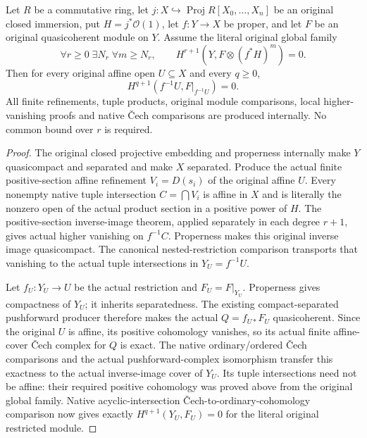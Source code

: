 \begin{theorem}
\label{thm:proj-affine-original-inverse-higher-vanishing}
\leanok
Let $R$ be a commutative ring, let
$j:X\hookrightarrow\operatorname{Proj}R[X_0,\ldots,X_n]$ be an
original closed immersion, put $H=j^*\mathcal O(1)$, let
$f:Y\to X$ be proper, and let $F$ be an original quasicoherent module
on $Y$. Assume the literal original global family
\[
 \forall r\geq0\;\exists N_r\;\forall m\geq N_r,\qquad
 H^{r+1}(Y,F\otimes(f^*H)^m)=0.
\]
Then for every original affine open $U\subseteq X$ and every $q\geq0$,
\[
 H^{q+1}(f^{-1}U,F|_{f^{-1}U})=0.
\]
All finite refinements, tuple products, original module comparisons,
local higher-vanishing proofs and native \v{C}ech comparisons are
produced internally. No common bound over $r$ is required.
\end{theorem}
\begin{proof}
The original closed projective embedding and properness internally
make $Y$ quasicompact and separated and make $X$ separated.
Produce the actual finite positive-section affine refinement
$V_i=D(s_i)$ of the original affine $U$. Every nonempty native tuple
intersection $C=\bigcap V_i$ is affine in $X$ and is literally the
nonzero open of the actual product section in a positive power of
$H$. The positive-section inverse-image theorem, applied separately
in each degree $r+1$, gives actual higher vanishing on $f^{-1}C$.
Properness makes this original inverse image quasicompact. The
canonical nested-restriction comparison transports that vanishing
to the actual tuple intersections in $Y_U=f^{-1}U$.

Let $f_U:Y_U\to U$ be the actual restriction and
$F_U=F|_{Y_U}$. Properness gives compactness of $Y_U$; it inherits
separatedness. The existing compact-separated pushforward producer
therefore makes the actual $Q=f_{U*}F_U$ quasicoherent. Since the
original $U$ is affine, its positive cohomology vanishes, so its
actual finite affine-cover \v{C}ech complex for $Q$ is exact.
The native ordinary/ordered \v{C}ech comparisons and the actual
pushforward-complex isomorphism transfer this exactness to the
actual inverse-image cover of $Y_U$. Its tuple intersections need
not be affine: their required positive cohomology was proved above
from the original global family. Native acyclic-intersection
\v{C}ech-to-ordinary-cohomology comparison now gives exactly
$H^{q+1}(Y_U,F_U)=0$ for the literal original restricted module.
\end{proof}

